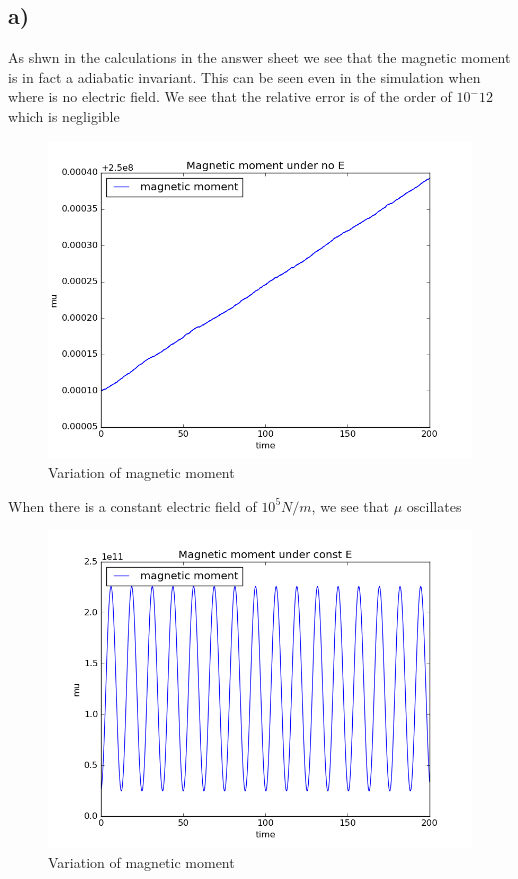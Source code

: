 \documentclass[11pt, a4paper]{article}
\begin{document}
\subsection{a)}
As shwn in the calculations in the answer sheet we see that the magnetic moment is in fact a adiabatic invariant.
This can be seen even in the simulation when where is no electric field. We see that the relative error is of the order of $10^-12$ which is negligible
\begin{figure}[H]
 \centering
 \includegraphics[scale = 0.6]{ques2a_1.png}
 \caption{Variation of magnetic moment}
\end{figure}
When there is a constant electric field of $10^5N/m$, we see that $\mu$ oscillates
\begin{figure}[H]
 \centering
 \includegraphics[scale = 0.6]{ques2a_2.png}
 \caption{Variation of magnetic moment}
\end{figure}
\end{document}
